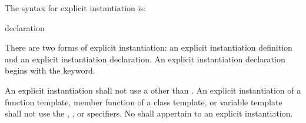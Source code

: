 \pnum
The syntax for explicit instantiation is:

\begin{bnf}
\br
    declaration
\end{bnf}

There are two forms of explicit instantiation: an explicit instantiation
definition and an explicit instantiation declaration. An explicit instantiation
declaration begins with the  keyword.

\pnum
An explicit instantiation shall not use
a 
other than .
An explicit instantiation of a
function template,
member function of a class template, or
variable template
shall not
use the , , or  specifiers.
No 
shall appertain to an explicit instantiation.

